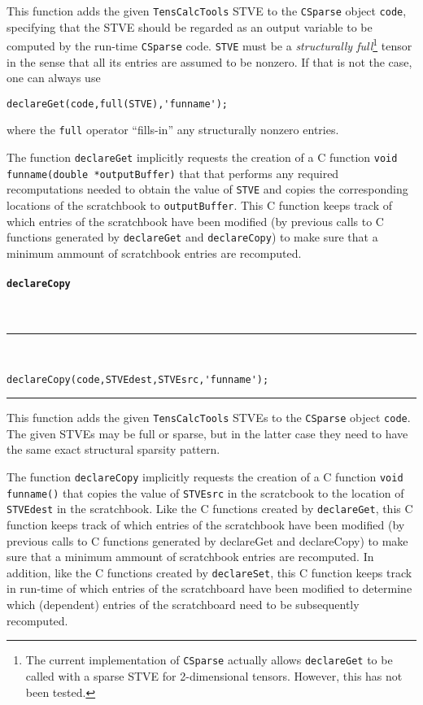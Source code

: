 \documentclass[11pt]{article}
\newcommand{\TC}{\texttt{TensCalcTools}}
\newcommand{\CS}{\texttt{CSparse}}
\newcommand{\codesize}{\footnotesize}
\newcommand{\toidx}[1]{\index{\lstinline{#1}}}%
\newenvironment{command}[1]{\toidx{#1}\addcontentsline{toc}{subsection}{\lstinline{#1}}\paragraph*{\lstinline[basicstyle=\large,columns={[l]flexible}]{#1}}~\\\noindent\rule{\textwidth}{2pt}\\\vspace{-3ex}\codesize}{\vspace{-3ex}\rule{\textwidth}{1pt}\medskip\noindent}
\begin{document}
This function adds the given \TC{} STVE to the \CS{} object
\lstinline{code}, specifying that the STVE should be regarded as an
output variable to be computed by the run-time \CS{}
code. \lstinline{STVE} must be a \emph{structurally full}\footnote{The
  current implementation of \CS{} actually allows
  \lstinline{declareGet} to be called with a sparse STVE for
  2-dimensional tensors. However, this has not been tested.} tensor in
the sense that all its entries are assumed to be nonzero. If that is
not the case, one can always use
\begin{lstlisting}
declareGet(code,full(STVE),'funname');
\end{lstlisting}
where the \lstinline{full} operator ``fills-in'' any structurally
nonzero entries.

\medskip

The function \lstinline{declareGet} implicitly requests the creation
of a C function \lstinline{void funname(double *outputBuffer)} that
that performs any required recomputations needed to obtain the value
of \lstinline{STVE} and copies the corresponding locations of the
scratchbook to \lstinline{outputBuffer}. This C function keeps track
of which entries of the scratchbook have been modified (by previous
calls to C functions generated by \lstinline{declareGet} and
\lstinline{declareCopy}) to make sure that a minimum ammount of
scratchbook entries are recomputed.

\begin{command}{declareCopy}
\begin{lstlisting}
declareCopy(code,STVEdest,STVEsrc,'funname');
\end{lstlisting}
\end{command}

This function adds the given \TC{} STVEs to the \CS{} object
\lstinline{code}. The given STVEs may be full or sparse, but in the
latter case they need to have the same exact structural sparsity
pattern.

\medskip

The function \lstinline{declareCopy} implicitly requests the creation
of a C function \lstinline{void funname()} that copies the value of
\lstinline{STVEsrc} in the scratcbook to the location of
\lstinline{STVEdest} in the scratchbook. Like the C functions created
by \lstinline{declareGet}, this C function keeps track of which
entries of the scratchbook have been modified (by previous calls to C
functions generated by declareGet and declareCopy) to make sure that a
minimum ammount of scratchbook entries are recomputed. In addition,
like the C functions created by \lstinline{declareSet}, this C
function keeps track in run-time of which entries of the scratchboard
have been modified to determine which (dependent) entries of the
scratchboard need to be subsequently recomputed.
\end{document}
